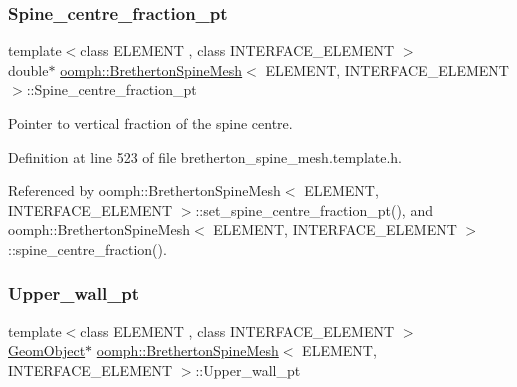 \subsubsection{\texorpdfstring{Spine\+\_\+centre\+\_\+fraction\+\_\+pt}{Spine\_centre\_fraction\_pt}}
{\footnotesize\ttfamily template$<$class E\+L\+E\+M\+E\+NT , class I\+N\+T\+E\+R\+F\+A\+C\+E\+\_\+\+E\+L\+E\+M\+E\+NT $>$ \\
double$\ast$ \hyperlink{classoomph_1_1BrethertonSpineMesh}{oomph\+::\+Bretherton\+Spine\+Mesh}$<$ E\+L\+E\+M\+E\+NT, I\+N\+T\+E\+R\+F\+A\+C\+E\+\_\+\+E\+L\+E\+M\+E\+NT $>$\+::Spine\+\_\+centre\+\_\+fraction\+\_\+pt\hspace{0.3cm}{\ttfamily [protected]}}



Pointer to vertical fraction of the spine centre. 



Definition at line 523 of file bretherton\+\_\+spine\+\_\+mesh.\+template.\+h.



Referenced by oomph\+::\+Bretherton\+Spine\+Mesh$<$ E\+L\+E\+M\+E\+N\+T, I\+N\+T\+E\+R\+F\+A\+C\+E\+\_\+\+E\+L\+E\+M\+E\+N\+T $>$\+::set\+\_\+spine\+\_\+centre\+\_\+fraction\+\_\+pt(), and oomph\+::\+Bretherton\+Spine\+Mesh$<$ E\+L\+E\+M\+E\+N\+T, I\+N\+T\+E\+R\+F\+A\+C\+E\+\_\+\+E\+L\+E\+M\+E\+N\+T $>$\+::spine\+\_\+centre\+\_\+fraction().

\mbox{\label{classoomph_1_1BrethertonSpineMesh_a1f97e78a12000afcc1bd754102b5b51a}} 
\subsubsection{\texorpdfstring{Upper\+\_\+wall\+\_\+pt}{Upper\_wall\_pt}}
{\footnotesize\ttfamily template$<$class E\+L\+E\+M\+E\+NT , class I\+N\+T\+E\+R\+F\+A\+C\+E\+\_\+\+E\+L\+E\+M\+E\+NT $>$ \\
\hyperlink{classoomph_1_1GeomObject}{Geom\+Object}$\ast$ \hyperlink{classoomph_1_1BrethertonSpineMesh}{oomph\+::\+Bretherton\+Spine\+Mesh}$<$ E\+L\+E\+M\+E\+NT, I\+N\+T\+E\+R\+F\+A\+C\+E\+\_\+\+E\+L\+E\+M\+E\+NT $>$\+::Upper\+\_\+wall\+\_\+pt\hspace{0.3cm}{\ttfamily [protected]}}



